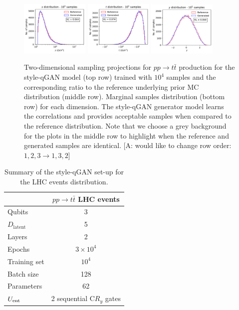 \documentclass[twocolumn,preprintnumbers,superscriptaddress]{revtex4-2}
\newcommand{\commentAF}[1]{{\color{cyan} {[A: #1]}}}
\begin{document}
\begin{figure}
  \includegraphics[width=0.29\textwidth]{plots/LHCttbar/s-distribution_LHCdata_100k.pdf}%
  \includegraphics[width=0.29\textwidth]{plots/LHCttbar/t-distribution_LHCdata_100k.pdf}%
  \includegraphics[width=0.29\textwidth]{plots/LHCttbar/y-distribution_LHCdata_100k.pdf}

  \caption{\label{fig:ttbar}Two-dimensional sampling projections for $pp
  \rightarrow t\bar{t}$ production for the style-qGAN model (top row) trained
  with $10^4$ samples and the corresponding ratio to the reference underlying
  prior MC distribution (middle row). Marginal samples distribution (bottom row)
  for each dimension. The style-qGAN generator model learns the correlations and
  provides acceptable samples when compared to the reference distribution. Note that we choose a grey background for the plots in the middle row to highlight when the reference and generated samples are identical.
  \commentAF{would like to change row order: $1,2,3 \rightarrow 1,3,2$}}
\end{figure}

\begin{table}
  \begin{tabular}{l|c}
     & {\bf $pp \rightarrow t\bar{t}$ LHC events} \tabularnewline
    \hline
    Qubits & 3  \tabularnewline
    $D_{\mathrm{latent}}$ & 5 \tabularnewline
    Layers & 2  \tabularnewline
    Epochs & $3\times10^4$ \tabularnewline
    Training set & $10^4$ \tabularnewline
    Batch size & 128 \tabularnewline
    Parameters & 62 \tabularnewline
    $U_{\rm ent}$ & 2 sequential C$R_y$ gates \tabularnewline
    \hline
  \end{tabular}

  \caption{\label{table:summary_lhc} Summary of the style-qGAN set-up for the LHC events distribution.}
\end{table}
\end{document}
